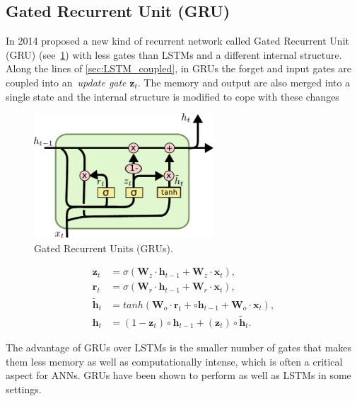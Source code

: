 \subsection{Gated Recurrent Unit (GRU)}\label{sec:GRU}

In 2014 \cite{Cho_14} proposed a new kind of recurrent network called Gated Recurrent Unit (GRU) (see~\ref{fig:GRU}) with less gates than LSTMs and a different internal structure. Along the lines of \ref{sec:LSTM_coupled}, in GRUs the forget and input gates are coupled into an~\emph{update gate} $\mathbf{z}_t$.  The memory and output are also merged into a single state and the internal structure is modified to cope with these changes

\begin{figure}
	\centering
	\includegraphics[width=0.6\textwidth]{figures/GRU.pdf}
	\caption{Gated Recurrent Units (GRUs).\label{fig:GRU}}
\end{figure}

\begin{equation}\label{eq:GRU}
\begin{split}
\mathbf{z}_t &= \sigma \left(\mathbf{W}_z \cdot \mathbf{h}_{t-1} +
\mathbf{W}_z \cdot \mathbf{x}_t\right), \\
\mathbf{r}_t &= \sigma \left(\mathbf{W}_r \cdot \mathbf{h}_{t-1} +
\mathbf{W}_r \cdot \mathbf{x}_t\right), \\
\mathbf{\tilde h}_t &= tanh \left(
\mathbf{W}_o \cdot \mathbf{r}_t + \circ \mathbf{h}_{t-1} +
\mathbf{W}_o \cdot \mathbf{x}_t
\right), \\
\mathbf{h}_t &= (1-\mathbf{z}_t) \circ \mathbf{h}_{t-1} +
(\mathbf{z}_t) \circ \mathbf{\tilde h}_t.
\end{split}
\end{equation}

The advantage of GRUs over LSTMs is the smaller number of gates that makes them less memory as well as computationally intense, which is often a critical aspect for ANNs. GRUs have been shown to perform as well as LSTMs in some settings.

